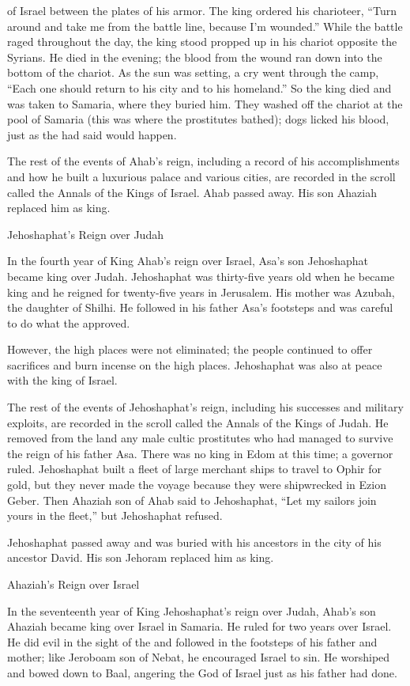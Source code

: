 {of Israel
between
the plates
of his armor.
The king ordered
his charioteer,
“Turn
around
and take
me from
the battle line,
because
I’m wounded.”
While the battle
raged
throughout the day,
the king
stood
propped
up in his chariot
opposite
the Syrians.
He died
in the evening;
the blood
from the wound
ran down into
the bottom
of the chariot.
As the sun
was setting,
a cry
went through
the camp,
“Each
one
should return to
his city
and to
his homeland.”
So the king
died
and was taken
to Samaria,
where they buried him.
They washed
off the chariot
at the pool
of Samaria
(this was where the prostitutes
bathed); dogs
licked
his blood,
just as
the {}
had
said would happen.
\par }{\PP {}The rest
of the events
of Ahab’s
reign, including a record
of his accomplishments
and how
he built
a luxurious palace
and various
cities,
are recorded
in the scroll
called the Annals
of the Kings
of Israel.
Ahab
passed away.
His son
Ahaziah
replaced
him as king.
\par }{\SH Jehoshaphat’s Reign over Judah
\par }{\PP {}In the fourth
year
of King
Ahab’s
reign over Israel,
Asa’s
son
Jehoshaphat
became king
over
Judah.
Jehoshaphat
was thirty-five
years
old
when he became king and he reigned
for twenty-five
years
in Jerusalem.
His mother
was Azubah,
the daughter
of Shilhi.
He followed
in his father
Asa’s
footsteps
and was careful
to do what
the {}
approved.

However,
the high places
were not
eliminated;
the people
continued
to offer sacrifices and burn incense
on the high places.
Jehoshaphat
was also at peace
with
the king
of Israel.
\par }{\PP {}The rest
of the events
of Jehoshaphat’s
reign,
including his successes
and military exploits,
are recorded
in
the scroll
called the Annals
of the Kings
of Judah.
He removed
from
the land
any male cultic prostitutes
who had
managed to survive
the reign
of his father
Asa.
There was no
king
in Edom
at this time; a governor
ruled.
Jehoshaphat
built a fleet of large merchant ships
to travel
to Ophir
for gold,
but they never
made
the voyage
because
they were shipwrecked
in Ezion Geber.
Then
Ahaziah
son
of Ahab
said
to
Jehoshaphat,
“Let my sailors
join
yours
in the fleet,”
but Jehoshaphat
refused.
\par }{\PP {}Jehoshaphat
passed away
and was buried
with
his ancestors
in the city
of his ancestor
David.
His son
Jehoram
replaced
him as king.
\par }{\SH Ahaziah’s Reign over Israel
\par }{\PP {}In the seventeenth
year
of King
Jehoshaphat’s
reign over Judah,
Ahab’s
son
Ahaziah
became king
over
Israel
in Samaria.
He ruled
for two years
over
Israel.
He did
evil
in the sight
of the
{}
and followed
in the footsteps
of his father
and mother;
like
Jeroboam
son
of Nebat,
he encouraged
Israel
to sin.
He worshiped
and bowed
down to Baal,
angering
the {}
God
of Israel
just
as his father
had done.
\par }